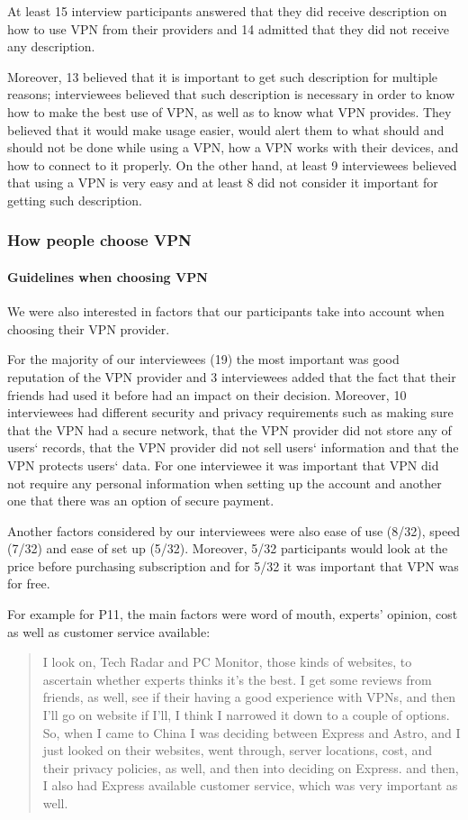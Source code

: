 At least 15 interview participants answered that they did receive description
on how to use VPN from their providers and 14 admitted that they did not
receive any description.  

Moreover, 13 believed that it is important to get such description for
multiple reasons; interviewees believed that such description is necessary in
order to know how to make the best use of VPN, as well as to know what VPN
provides. They believed that it would make usage easier, would alert them to what should and should not be done while using a VPN, how a
VPN works with their devices, and how to connect to it properly. On the
other hand, at least 9 interviewees believed that using a VPN is very easy and
at least 8 did not consider it important for getting such description. 

\subsubsection{How people choose VPN} \label{sec:findings-choosing}
\paragraph{Guidelines when choosing VPN} We were also interested in factors that
our participants take into account when choosing their VPN provider.

For the majority of our interviewees (19) the most
important was good reputation of the VPN provider and 3 interviewees added
that the fact that their friends had used it before had an impact on their
decision.  Moreover, 10 interviewees had different
security and privacy requirements such as making sure that the VPN had a secure network,
that the VPN provider did not store any of users‘ records, that the VPN provider did
not sell users‘ information and that the VPN protects users‘ data. For one
interviewee it was important that VPN did not require any personal information
when setting up the account and another one that there was an option of secure
payment. 

 Another factors considered by our interviewees were also
ease of use (8/32), speed (7/32) and ease of set up (5/32). Moreover, 5/32 participants
would look at the price before purchasing subscription and for 5/32 it was
important that VPN was for free.   

For example for P11, the main factors were word of mouth, experts’ opinion,
cost as well as customer service available: \begin{quote} I look
    on, Tech Radar and PC Monitor, those kinds of websites, to ascertain
    whether experts thinks it's the best. I get some reviews from friends, as
    well, see if their having a good experience with VPNs, and then I'll go on
    website if I'll, I think I narrowed it down to a couple of
    options. So, when I came to China I was deciding between Express and
    Astro, and I just looked on their websites, went through, server
    locations, cost, and their privacy policies, as well, and then into
    deciding on Express. and then, I also had Express available
customer service, which was very important as well.\end{quote}

